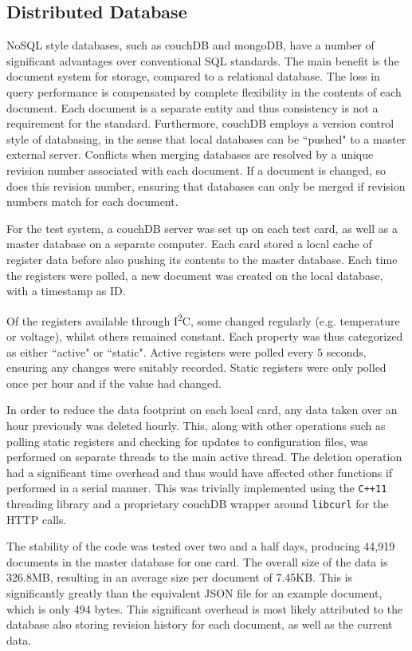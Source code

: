 \documentclass[a4paper,11pt,twocolumn]{article}
\begin{document}
	\subsection{Distributed Database} 
	NoSQL style databases, such as couchDB and mongoDB, have a number of significant advantages over conventional SQL standards. The main benefit is the document system for storage, compared to a relational database. The loss in query performance is compensated by complete flexibility in the contents of each document. Each document is a separate entity and thus consistency is not a requirement for the standard. Furthermore, couchDB employs a version control style of databasing, in the sense that local databases can be ``pushed" to a master external server. Conflicts when merging databases are resolved by a unique revision number associated with each document. If a document is changed, so does this revision number, ensuring that databases can only be merged if revision numbers match for each document. 

	For the test system, a couchDB server was set up on each test card, as well as a master database on a separate computer. Each card stored a local cache of register data before also pushing its contents to the master database. Each time the registers were polled, a new document was created on the local database, with a timestamp as ID. 

	Of the registers available through I\textsuperscript{2}C, some changed regularly (e.g. temperature or voltage), whilst others remained constant. Each property was thus categorized as either ``active" or ``static". Active registers were polled every 5 seconds, ensuring any changes were suitably recorded. Static registers were only polled once per hour and if the value had changed. 
	
	In order to reduce the data footprint on each local card, any data taken over an hour previously was deleted hourly. This, along with other operations such as polling static registers and checking for updates to configuration files, was performed on separate threads to the main active thread. The deletion operation had a significant time overhead and thus would have affected other functions if performed in a serial manner. This was trivially implemented using the \verb|C++11| threading library and a proprietary couchDB wrapper around \verb|libcurl| for the HTTP calls. 
	
	The stability of the code was tested over two and a half days, producing 44,919 documents in the master database for one card. The overall size of the data is 326.8MB, resulting in an average size per document of 7.45KB. This is significantly greatly than the equivalent JSON file for an example document, which is only 494 bytes. This significant overhead is most likely attributed to the database also storing revision history for each document, as well as the current data.  
\end{document}
